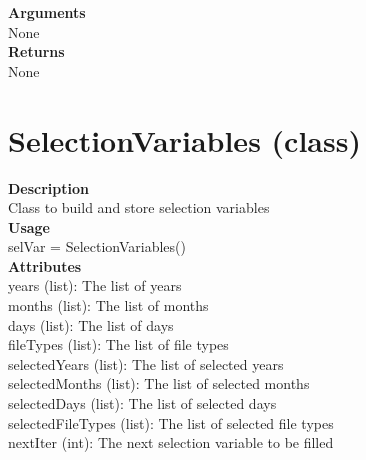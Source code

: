 \documentclass[11pt, oneside]{article}
\begin{document}
\noindent\textbf{Arguments} \\
        None\\

\noindent\textbf{Returns} \\
        None\\

\newpage

\section{SelectionVariables (class)}

\textbf{Description} \\
        Class to build and store selection variables\\

\noindent\textbf{Usage} \\
        selVar = SelectionVariables() \\

\noindent\textbf{Attributes} \\
        years (list): The list of years\\
        months (list): The list of months\\
        days (list): The list of days\\
        fileTypes (list): The list of file types\\
        selectedYears (list): The list of selected years\\
        selectedMonths (list): The list of selected months\\
        selectedDays (list): The list of selected days\\
        selectedFileTypes (list): The list of selected file types\\
        nextIter (int): The next selection variable to be filled\\
\end{document}

